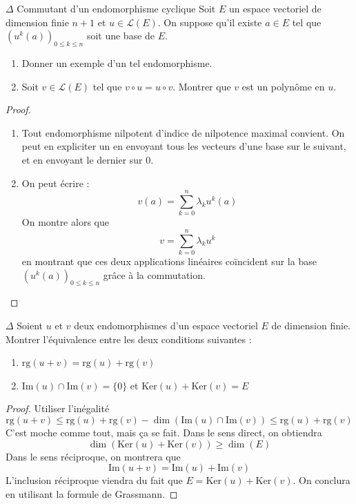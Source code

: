 \documentclass[french,a4paper]{article}
\renewcommand{\ker}{\text{Ker}}
\newcommand{\im}{\text{Im}}
\theoremstyle{plain}
\theoremstyle{definition}
\theoremstyle{remark}
\begin{document}
\begin{ex}[Moulin.EV.40]{$\Delta$ Commutant d'un endomorphisme cyclique}
	Soit $E$ un espace vectoriel de dimension finie $n+1$ et $u\in\mathcal{L}(E)$. On suppose qu'il existe $a\in E$ tel que $\left(u^k(a)\right)_{0\leqslant k\leqslant n}$ soit une base de $E$.
	\begin{enumerate}
		\item Donner un exemple d'un tel endomorphisme.
		\item Soit $v\in \mathcal{L}(E)$ tel que $v\circ u=u\circ v$. Montrer que $v$ est un polynôme en $u$.
	\end{enumerate}
\end{ex}
\begin{proof}
	\begin{enumerate}
		\item Tout endomorphisme nilpotent d'indice de nilpotence maximal convient. On peut en expliciter un en envoyant tous les vecteurs d'une base sur le suivant, et en envoyant le dernier sur $0$.
		\item On peut écrire : $$v(a)=\sum_{k=0}^{n}\lambda_ku^k(a)$$ On montre alors que $$v=\sum_{k=0}^{n}\lambda_k u^k$$ en montrant que ces deux applications linéaires coïncident sur la base $\left(u^k(a)\right)_{0\leqslant k\leqslant n}$ grâce à la commutation.
	\end{enumerate}
\end{proof}

\begin{ex}[Moulin.EV.41]{$\Delta$}
	Soient $u$ et $v$ deux endomorphismes d'un espace vectoriel $E$ de dimension finie. Montrer l'équivalence entre les deux conditions suivantes :
	\begin{enumerate}
		\item $\text{rg}(u+v)=\text{rg}(u)+\text{rg}(v)$
		\item $\im(u)\cap\im(v)=\{0\}$ et $\ker(u)+\ker(v)=E$
	\end{enumerate}
\end{ex}
\begin{proof}
	Utiliser l'inégalité $$\text{rg}(u+v)\leqslant\text{rg}(u)+\text{rg}(v)-\dim\left(\im(u)\cap\im(v)\right)\leqslant\text{rg}(u)+\text{rg}(v)$$ C'est moche comme tout, mais ça se fait. Dans le sens direct, on obtiendra $$\dim(\ker(u)+\ker(v))\geqslant\dim(E)$$Dans le sens réciproque, on montrera que $$\im(u+v)=\im(u)+\im(v)$$ L'inclusion réciproque viendra du fait que $E=\ker(u)+\ker(v)$. On conclura en utilisant la formule de Grassmann. 
\end{proof}
\end{document}
